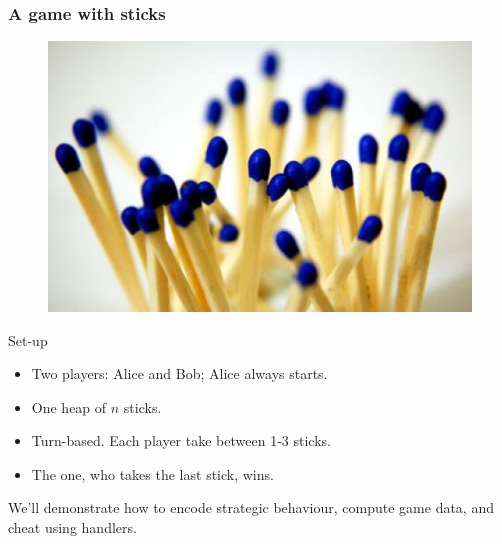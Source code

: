 \begin{frame}
  \frametitle{A game with sticks}
  \begin{center}
    \begin{figure}
      \includegraphics[scale=0.3]{sticks.jpg}
    \end{figure}
  \end{center}
  Set-up
  \begin{itemize}
    \item Two players: Alice and Bob; Alice always starts.
    \item One heap of $n$ sticks.
    \item Turn-based. Each player take between 1-3 sticks.
    \item The one, who takes the last stick, wins.
  \end{itemize}
We'll demonstrate how to encode strategic behaviour, compute game data, and cheat using handlers.
\end{frame}

